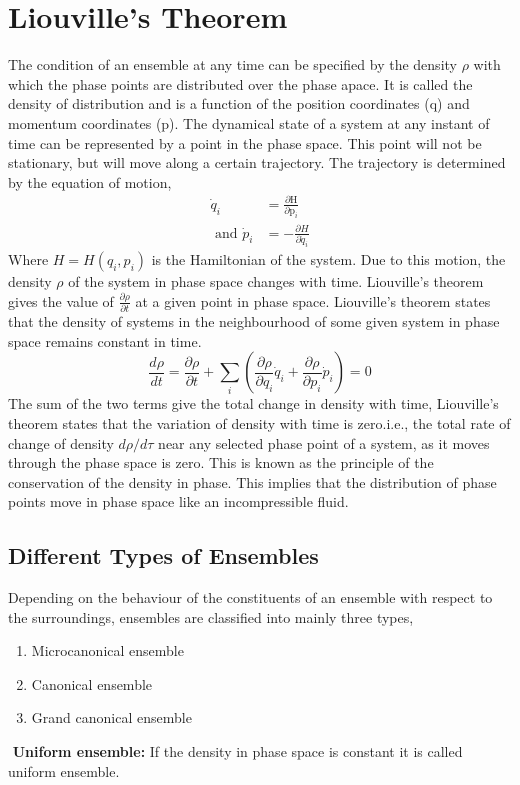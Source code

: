 \section{Liouville's Theorem}
The condition of an ensemble at any time can be specified by the density $\rho$ with which the phase points are distributed over the phase apace.  It is called the density of distribution and is a function of the position coordinates (q) and momentum coordinates (p).
The dynamical state of a system at any instant of time can be represented by a point in the phase space.  This point will not be stationary, but will move along a certain trajectory. The trajectory is determined by the equation of motion,
\begin{align}
\dot{q}_{i}&=\frac{\partial \mathrm{H}}{\partial \mathrm{p}_{i}}\\
\text{ and } \dot{p}_{i}&=-\frac{\partial H}{\partial \dot{q}_{i}}
\end{align}
Where $H=H\left(q_{i}, p_{i}\right)$ is the Hamiltonian of the system. Due to this motion, the density $\rho$ of the system in phase space changes with time.
Liouville's theorem gives the value of $\frac{\partial \rho}{\partial t}$ at a given point in phase space.
Liouville's theorem states that the density of systems in the neighbourhood of some given system in phase space remains constant in time.
\begin{equation}
\frac{d \rho}{d t}=\frac{\partial \rho}{\partial t}+\sum_{i}\left(\frac{\partial \rho}{\partial q_{i}} \dot{q}_{i}+\frac{\partial \rho}{\partial p_{i}} \dot{p}_{i}\right)=0
\end{equation}
The sum of the two terms give the total change in density with time, Liouville's theorem states that the variation of density with time is zero.i.e., the total rate of change of density $d\rho/d\tau$ near any selected phase point of a system, as it moves through the phase space is zero.
This is known as the principle of the conservation of the density in phase.  This implies that the distribution of phase points move in phase space like an incompressible fluid.\\
\subsection{Different Types of Ensembles}
Depending on the behaviour of the constituents of an ensemble with respect to the surroundings, ensembles are classified into mainly three types,
\begin{enumerate}
	\item Microcanonical ensemble
	\item Canonical ensemble
	\item Grand canonical ensemble
\end{enumerate} 
\begin{note}
	$\left. \right. $ \textbf{Uniform ensemble: }If the density in phase space is constant it is called uniform ensemble.
\end{note}


